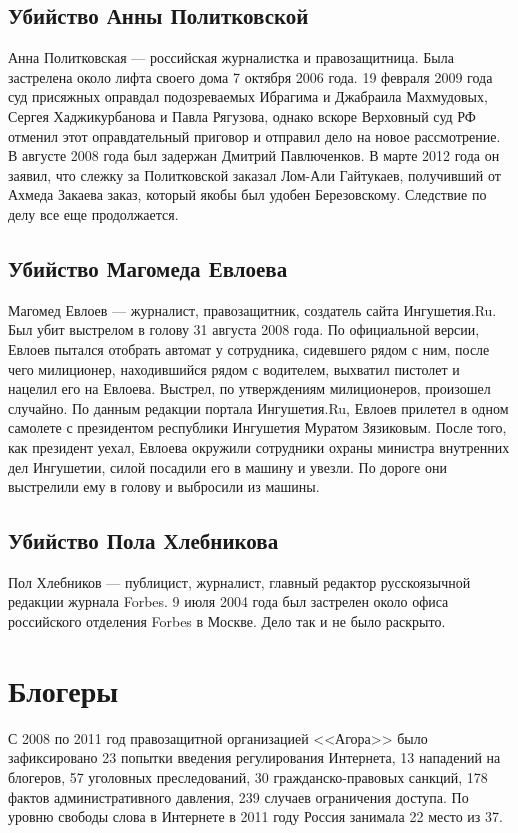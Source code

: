 \subsection{Убийство Анны Политковской}
Анна Политковская --- российская журналистка и правозащитница. Была застрелена около лифта своего дома 7 октября 2006 года\cite{politkovskaya_death}. 19 февраля 2009 года суд присяжных оправдал подозреваемых Ибрагима и Джабраила Махмудовых, Сергея Хаджикурбанова и Павла Рягузова\cite{politkovskaya_court1}, однако вскоре Верховный суд РФ отменил этот оправдательный приговор и отправил дело на новое рассмотрение\cite{politkovskaya_court2,politkovskaya_court3}. В августе 2008 года был задержан Дмитрий Павлюченков\cite{politkovskaya_pavluchenkov}. В марте 2012 года он заявил, что слежку за Политковской заказал Лом-Али Гайтукаев, получивший от Ахмеда Закаева заказ, который якобы был удобен Березовскому\cite{politkovskaya_head}. Следствие по делу все еще продолжается.
\subsection{Убийство Магомеда Евлоева}
Магомед Евлоев --- журналист, правозащитник, создатель сайта Ингушетия.Ru. Был убит выстрелом в голову 31 августа 2008 года. По официальной версии, Евлоев пытался отобрать автомат у сотрудника, сидевшего рядом с ним, после чего милиционер, находившийся рядом с водителем, выхватил пистолет и нацелил его на Евлоева. Выстрел, по утверждениям милиционеров, произошел случайно\cite{evloev_mvd}. По данным редакции портала Ингушетия.Ru, Евлоев прилетел в одном самолете с президентом республики Ингушетия Муратом Зязиковым. После того, как президент уехал, Евлоева окружили сотрудники охраны министра внутренних дел Ингушетии, силой посадили его в машину и увезли. По дороге они выстрелили ему в голову и выбросили из машины\cite{evloev_death}.
\subsection{Убийство Пола Хлебникова}
Пол Хлебников --- публицист, журналист, главный редактор русскоязычной редакции журнала Forbes. 9 июля 2004 года был застрелен около офиса российского отделения Forbes в Москве\cite{hlebnikov_death}. Дело так и не было раскрыто.
\section{Блогеры}
С 2008 по 2011 год правозащитной организацией <<Агора>> было зафиксировано 23 попытки введения регулирования Интернета, 13 нападений на блогеров, 57 уголовных преследований, 30 гражданско-правовых санкций, 178 фактов административного давления, 239 случаев ограничения доступа\cite{agoranet,agoranet2011}. По уровню свободы слова в Интернете в 2011 году Россия занимала 22 место из 37\cite{netfreedom}.

